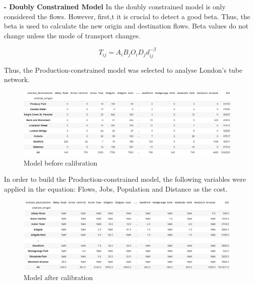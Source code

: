 \documentclass[10pt]{report}
\numberwithin{figure}{section}
\numberwithin{table}{section}
\begin{document}
\vspace{5mm} %
\textbf{- Doubly Constrained Model}
 In the doubly constrained model is only considered the flows. However, first,t it is crucial to detect a good beta. Thus, the beta is used to calculate the new origin and destination flows. Beta values do not change unless the mode of transport changes. 

\begin{equation} \tag{4}
T_{ij} = A_i B_j O_i D_j d_{ij}^{-\beta}
\end{equation}

\vspace{5mm} %

Thus, the Production-constrained model was selected to analyse London's tube network. 

    \begin{figure}[htp]
        \centering
        \includegraphics[width=16cm]{Image/Part2_OD.png}
        \caption{Model before calibration}
        \label{fig: Model before calibration}
    \end{figure}

In order to build the Production-constrained model, the following variables were applied in the equation: Flows, Jobs, Population and Distance as the cost. 

    \begin{figure}[htp]
        \centering
        \includegraphics[width=16cm]{Image/Part2_OD2.png}
        \caption{Model after calibration}
        \label{fig: Model after calibration}
    \end{figure}

   
\end{document}
